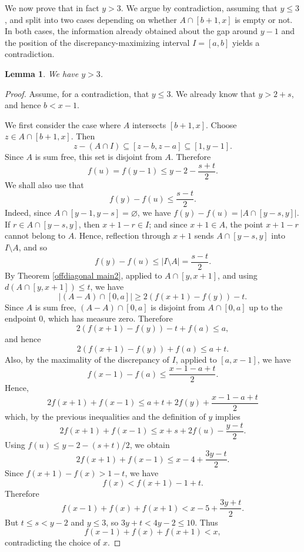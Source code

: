 \documentclass[11pt,reqno]{amsart}
\newtheorem{lem}[thm]{Lemma}
\theoremstyle{definition}
\def\F#1{f(#1)}
\begin{document}
We now prove that in fact $y>3$. We argue by contradiction, assuming that $y\leq 3$, and split into two cases depending on whether $A\cap [b+1,x]$ is empty or not. In both cases, the information already obtained about the gap around $y-1$ and the position of the discrepancy-maximizing interval $I=[a,b]$ yields a contradiction.
\begin{lem} \label{y > 3 lem}
   We have $y > 3$. 
\end{lem}
\begin{proof}
    Assume, for a contradiction, that $y\leq 3$. We already know that $y>2+s$, and hence $b<x-1$.

We first consider the case where $A$ intersects $[b+1,x]$. Choose $z\in A\cap[b+1,x]$. Then
$$
z-(A\cap I)\subseteq [z-b,z-a]\subseteq [1,y-1].
$$
Since $A$ is sum free, this set is disjoint from $A$.
Therefore
$$
\F{u}=\F{y-1}\leq y-2-\frac{s+t}{2}.
$$
We shall also use that
$$
\F{y}-\F{u}\leq \frac{s-t}{2}.
$$
Indeed, since $A\cap[y-1,y-s]=\varnothing$, we have
$\F{y}-\F{u}=|A\cap[y-s,y]|$. If $r\in A\cap[y-s,y]$, then $x+1-r\in I$; and since $x+1\in A$, the point $x+1-r$ cannot belong to $A$. Hence,   reflection through $x+1$ sends $A\cap[y-s,y]$ into $I\setminus A$, and so
$$
\F{y}-\F{u}\leq |I\setminus A|=\frac{s-t}{2}.
$$
By Theorem \ref{offdiagonal main2}, applied to $A\cap[y,x+1]$, and using
$d(A\cap[y,x+1])\leq t$, we have
$$
    |(A-A)\cap[0,a]|\geq 2(\F{x+1}-\F{y})-t.
$$
Since $A$ is sum free, $(A-A)\cap[0,a]$ is disjoint from $A\cap[0,a]$ up to the endpoint $0$, which has measure zero. Therefore
$$
    2(\F{x+1}-\F{y})-t+\F{a}\leq a,
$$
and hence
$$
    2(\F{x+1}-\F{y})+\F{a}\leq a+t.
$$
Also, by the maximality of the discrepancy of $I$, applied to $[a,x-1]$, we have
$$
\F{x-1}-\F{a}\leq \frac{x-1-a+t}{2}.
$$
Hence,  
$$
2\F{x+1}+\F{x-1}\leq a+t+2\F{y}+\frac{x-1-a+t}{2}
$$
which, by the previous inequalities and the definition of $y$ implies
$$
2\F{x+1}+\F{x-1}\leq x+s+2\F{u}-\frac{y-t}{2}.
$$
Using $\F{u}\leq y-2-(s+t)/2$, we obtain
$$
2\F{x+1}+\F{x-1}
\leq x-4+\frac{3y-t}{2}.
$$
Since $\F{x+1}-\F{x}>1-t$, we have
$$
\F{x}<\F{x+1}-1+t.
$$
Therefore
$$
\F{x-1}+\F{x}+\F{x+1}
<x-5+\frac{3y+t}{2}.
$$
But $t\leq s<y-2$ and $y\leq3$, so $3y+t<4y-2\leq10$. Thus
$$
\F{x-1}+\F{x}+\F{x+1}<x,
$$
contradicting the choice of $x$.



\end{proof}
\end{document}
